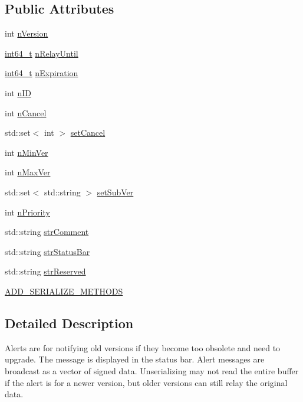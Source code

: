 \subsection*{Public Attributes}
\begin{DoxyCompactItemize}
\item 
int \hyperlink{class_c_unsigned_alert_ad8fad8e8f62caaf8162fad19170de2cf}{n\+Version}
\item 
\hyperlink{stdint_8h_adec1df1b8b51cb32b77e5b86fff46471}{int64\+\_\+t} \hyperlink{class_c_unsigned_alert_a13bb82aef8b496584f6b3ae6424f8e58}{n\+Relay\+Until}
\item 
\hyperlink{stdint_8h_adec1df1b8b51cb32b77e5b86fff46471}{int64\+\_\+t} \hyperlink{class_c_unsigned_alert_af77a9d4d3abc0a0b376a7689059620e8}{n\+Expiration}
\item 
int \hyperlink{class_c_unsigned_alert_a4e11dc713526f6597a20762e707518a0}{n\+I\+D}
\item 
int \hyperlink{class_c_unsigned_alert_a28de8ffcdfea75db2061b2cdc1add04a}{n\+Cancel}
\item 
std\+::set$<$ int $>$ \hyperlink{class_c_unsigned_alert_ab1978ea23d02720d515bcdcf9d0dbdb0}{set\+Cancel}
\item 
int \hyperlink{class_c_unsigned_alert_af7ab540ea7df8e97fbfba7551ec31b1a}{n\+Min\+Ver}
\item 
int \hyperlink{class_c_unsigned_alert_a041bff847e178c132cb4d5234c1f41c8}{n\+Max\+Ver}
\item 
std\+::set$<$ std\+::string $>$ \hyperlink{class_c_unsigned_alert_a1b7148c413e1781222c5748935cad200}{set\+Sub\+Ver}
\item 
int \hyperlink{class_c_unsigned_alert_acf7253ae21d58a8633faab0635f5f5f5}{n\+Priority}
\item 
std\+::string \hyperlink{class_c_unsigned_alert_a8c9cd8c9706c14df3c5d6b9b1ed3b130}{str\+Comment}
\item 
std\+::string \hyperlink{class_c_unsigned_alert_a97cfbf9a49b770bb84e49389ac1489c2}{str\+Status\+Bar}
\item 
std\+::string \hyperlink{class_c_unsigned_alert_a0115109fd39d48f37a412d5f50a78828}{str\+Reserved}
\item 
\hyperlink{class_c_unsigned_alert_a24489988876bbf2c38a5f379e4057a53}{A\+D\+D\+\_\+\+S\+E\+R\+I\+A\+L\+I\+Z\+E\+\_\+\+M\+E\+T\+H\+O\+D\+S}
\end{DoxyCompactItemize}


\subsection{Detailed Description}
Alerts are for notifying old versions if they become too obsolete and need to upgrade. The message is displayed in the status bar. Alert messages are broadcast as a vector of signed data. Unserializing may not read the entire buffer if the alert is for a newer version, but older versions can still relay the original data. 

